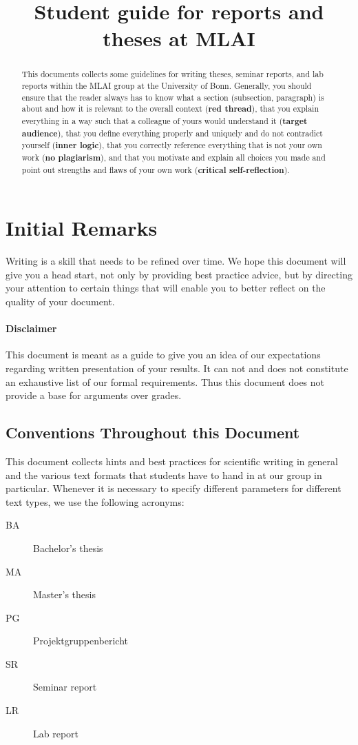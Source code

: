 \documentclass[logo, twocolumn]{mlai-report}
\date{} %
\title{Student guide for reports and theses at MLAI}
\begin{document}
\maketitle

\begin{abstract}
	This documents collects some guidelines for writing theses, seminar reports, and lab reports within the MLAI group at the University of Bonn.
	Generally, you should ensure that
	the reader always has to know what a section (subsection, paragraph) is about and how it is relevant to the overall context (\textbf{red thread}), that you explain everything in a way such that a colleague of yours would understand it (\textbf{target audience}), that you define everything properly and uniquely and do not contradict yourself (\textbf{inner logic}), that you correctly reference everything that is not your own work (\textbf{no plagiarism}), and that you motivate and explain all choices you made and point out strengths and flaws of your own work (\textbf{critical self-reflection}).

\end{abstract}

\tableofcontents


\section{Initial Remarks}
Writing is a skill that needs to be refined over time. We hope this document will give you a head start, not only by providing best practice advice, but by directing your attention to certain things that will enable you to better reflect on the quality of your document.

\paragraph{Disclaimer} This document is meant as a guide to give you an idea of our expectations regarding written presentation of your results. It can not and does not constitute an exhaustive list of our formal requirements. Thus this document does not provide a base for arguments over grades.

\subsection{Conventions Throughout this Document}
This document collects hints and best practices for scientific writing in general and the various text formats that students have to hand in at our group in particular.
Whenever it is necessary to specify different parameters for different text types, we use the following acronyms:
\begin{description}
\item[BA] Bachelor's thesis
\item[MA] Master's thesis
\item[PG] Projektgruppenbericht
\item[SR] Seminar report
\item[LR] Lab report
\end{description}
\end{document}
